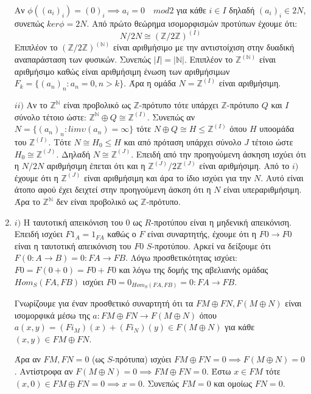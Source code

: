 \documentclass{article}
\begin{document}
\begin{enumerate}
	Αν $\phi \left( (a_i)_i \right) = (0)_i \implies a_i = 0 \quad mod 2$ για κάθε $i \in I$ δηλαδή $(a_i)_i \in 2N$, συνεπώς $ker\phi = 2N$. Από πρώτο θεώρημα ισομορφισμών προτύπων έχουμε ότι:
	$$ N / 2N \cong (\mathbb{Z} / 2 \mathbb{Z} )^{(I)}$$
	Επιπλέον το $(\mathbb{Z} / 2 \mathbb{Z})^{(\mathbb{N})}$ είναι αριθμήσιμο με την αντιστοίχιση στην δυαδική αναπαράσταση των φυσικών. Συνεπώς $|Ι| = |\mathbb{N}|$. Επιπλέον το $\mathbb{Z}^{(\mathbb{N})}$ είναι αριθμήσιμο καθώς είναι αριθμήσιμη ένωση των αριθμήσιμων $F_k = \{ (a_n)_n : a_n = 0, n > k\}$. Άρα η ομάδα $N = \mathbb{Z}^{(I)}$ είναι αριθμήσιμη.
	$ $\newline

	$ii)$ Αν το $\mathbb{Z}^{\mathbb{N}}$ είναι προβολικό ως $\mathbb{Z}$-πρότυπο τότε υπάρχει $\mathbb{Z}$-πρότυπο $Q$ και $I$ σύνολο τέτοιο ώστε: $ \mathbb{Z}^{\mathbb{N}} \oplus Q \cong \mathbb{Z}^{(I)}$. Συνεπώς αν $N = \{ (a_n)_n : lim \upsilon(a_n) = \infty \}$ τότε $N \oplus Q \cong H \leq \mathbb{Z}^{(I)}$ όπου $H$ υποομάδα του $\mathbb{Z}^{(I)}$. Τότε $N \cong H_0 \leq H$ και από πρόταση υπάρχει σύνολο $J$ τέτοιο ώστε $H_0 \cong \mathbb{Z}^{(J)}$. Δηλαδή $N \cong \mathbb{Z}^{(J)}$. Επειδή από την προηγούμενη άσκηση ισχύει ότι η $N / 2N$ αριθμήσιμη έπεται ότι και η $\mathbb{Z}^{(J)} / 2\mathbb{Z}^{(J)}$ είναι αριθμήσιμη. Από το $i)$ έχουμε ότι η $\mathbb{Z}^{(J)}$ είναι αριθμήσιμη και άρα το ίδιο ισχύει για την $N$. Αυτό είναι άτοπο αφού έχει δειχτεί στην προηγούμενη άσκση ότι η $N$ είναι υπεραριθμήσιμη. Άρα το $\mathbb{Z}^{\mathbb{N}}$ δεν είναι προβολικό ως $\mathbb{Z}$-πρότυπο.
	$ $\newline

\item $i)$ Η ταυτοτική απεικόνιση του 0 ως $R$-προτύπου είναι η μηδενική απεικόνιση. Επειδή ισχύει $F 1_A = 1_{FA}$ καθώς ο $F$ είναι συναρτητής, έχουμε ότι η $F 0 \rightarrow F 0$ είναι η ταυτοτική απεικόνιση του $F 0 $ $S$-προτύπου. Αρκεί να δείξουμε ότι $F(0: A \rightarrow B) = 0 : FA \rightarrow FB$. Λόγω προσθετικότητας ισχύει: $F 0 = F(0 + 0) = F 0 + F 0$ και λόγω της δομής της αβελιανής ομάδας $Hom_S (FA,FB)$ ισχύει $F 0 = 0_{Hom_S (FA,FB)} = 0 :FA \rightarrow FB$.
	$ $\newline

	Γνωρίζουμε για έναν προσθετικό συναρτητή ότι τα $FM \oplus FN, F(M\oplus N)$ είναι ισομορφικά μέσω της $a: FM \oplus FN \rightarrow F(M\oplus N)$ όπου $a(x,y) = (Fi_M)(x) + (Fi_N)(y) \in F(M\oplus N)$ για κάθε $(x,y) \in FM\oplus FN$.

	Άρα αν $FM,FN=0$ (ως $S$-πρότυπα) ισχύει $FM\oplus FN = 0 \implies F(M\oplus N)=0$. Αντίστροφα αν $F(M \oplus N) = 0 \implies FM\oplus FN = 0$. Έστω $x \in FM$ τότε $(x,0) \in FM\oplus FN = 0 \implies x =0$. Συνεπώς $FM=0$ και ομοίως $FN=0$.
	$ $\newline


\end{enumerate}
\end{document}

